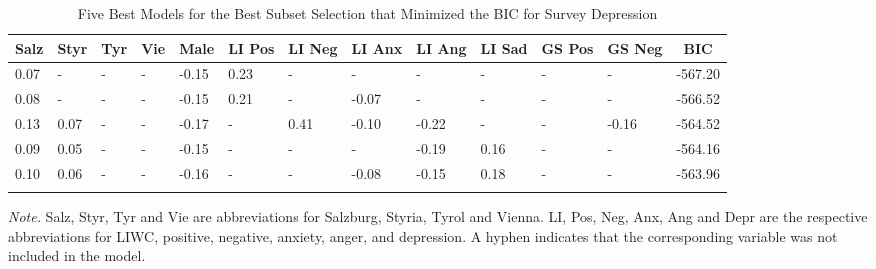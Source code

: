 \documentclass[
  english,
  jou,floatsintext]{apa7}
\begin{document}
\begin{table}[tbp]

\begin{center}
\begin{threeparttable}

\caption{\label{tab:subset-detail-6}Five Best Models for the Best Subset Selection that Minimized the BIC for Survey Depression}

\small{

\begin{tabular}{lllllllllllll}
\toprule
Salz & \multicolumn{1}{c}{Styr} & \multicolumn{1}{c}{Tyr} & \multicolumn{1}{c}{Vie} & \multicolumn{1}{c}{Male} & \multicolumn{1}{c}{LI Pos} & \multicolumn{1}{c}{LI Neg} & \multicolumn{1}{c}{LI Anx} & \multicolumn{1}{c}{LI Ang} & \multicolumn{1}{c}{LI Sad} & \multicolumn{1}{c}{GS Pos} & \multicolumn{1}{c}{GS Neg} & \multicolumn{1}{c}{BIC}\\
\midrule
0.07 & - & - & - & -0.15 & 0.23 & - & - & - & - & - & - & -567.20\\
0.08 & - & - & - & -0.15 & 0.21 & - & -0.07 & - & - & - & - & -566.52\\
0.13 & 0.07 & - & - & -0.17 & - & 0.41 & -0.10 & -0.22 & - & - & -0.16 & -564.52\\
0.09 & 0.05 & - & - & -0.15 & - & - & - & -0.19 & 0.16 & - & - & -564.16\\
0.10 & 0.06 & - & - & -0.16 & - & - & -0.08 & -0.15 & 0.18 & - & - & -563.96\\
\bottomrule
\addlinespace
\end{tabular}

}

\begin{tablenotes}[para]
\normalsize{\textit{Note.} Salz, Styr, Tyr and Vie are abbreviations for Salzburg, Styria, Tyrol and Vienna. LI, Pos, Neg, Anx, Ang and Depr are the respective abbreviations for LIWC, positive, negative, anxiety, anger, and depression. A hyphen indicates that the corresponding variable was not included in the model.}
\end{tablenotes}

\end{threeparttable}
\end{center}

\end{table}
\end{document}
